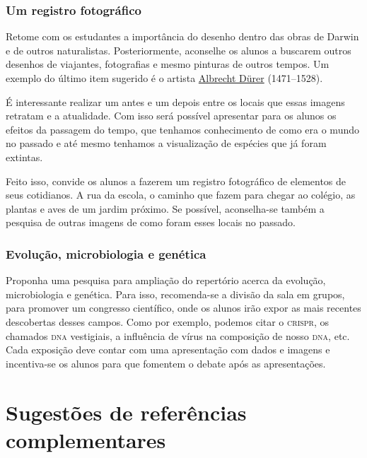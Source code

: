 \documentclass[11pt]{extarticle}
\begin{document}
\subsubsection{Um registro fotográfico}

Retome com os estudantes a importância do desenho dentro
      das obras de Darwin e de outros naturalistas. Posteriormente, aconselhe
      os alunos a buscarem outros desenhos de viajantes, fotografias e mesmo
      pinturas de outros tempos. Um exemplo do último item sugerido é o artista \href{https://www.artyfactory.com/art_appreciation/animals_in_art/albrecht_durer.htm}{Albrecht Dürer} (1471--1528). 

      É interessante realizar um antes e um depois
      entre os locais que essas imagens retratam e a atualidade. Com isso será
      possível apresentar para os alunos os efeitos da passagem do tempo,
      que tenhamos conhecimento de como era o mundo no passado
      e até mesmo tenhamos a visualização de espécies que já foram
      extintas. 

      Feito isso, convide os alunos a fazerem um registro fotográfico
      de elementos de seus cotidianos. A rua da escola, o caminho que fazem
      para chegar ao colégio, as plantas e aves de um jardim próximo. Se
  possível, aconselha-se também a pesquisa de outras imagens de como foram
  esses locais no passado.

\subsubsection{Evolução, microbiologia e genética}

Proponha uma pesquisa para ampliação do repertório acerca
      da evolução, microbiologia e genética. Para isso, recomenda-se a divisão
      da sala em grupos, para promover um congresso científico, onde os alunos
      irão expor as mais recentes descobertas desses campos. Como por exemplo,
      podemos citar o \textsc{crispr}, os chamados \textsc{dna} vestigiais, a influência de
      vírus na composição de nosso \textsc{dna}, etc. Cada exposição deve contar com uma
      apresentação com dados e imagens e incentiva-se os alunos para que
  fomentem o debate após as apresentações.  


\section{Sugestões de referências complementares}
\end{document}
